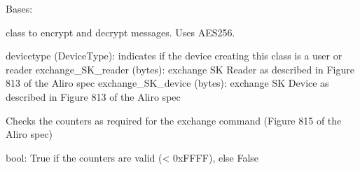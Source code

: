 \documentclass[letterpaper,10pt,english]{sphinxmanual}
\begin{document}
\begin{fulllineitems}
\label{\detokenize{aliro_actuator.access_protocol.encryption:aliro_actuator.access_protocol.encryption.EncryptionEngine}}
\pysigstartsignatures
{}
\pysigstopsignatures
\sphinxAtStartPar
Bases: 

\sphinxAtStartPar
class to encrypt and decrypt messages. Uses AES\sphinxhyphen{}256.
\begin{description}
\sphinxAtStartPar
devicetype (DeviceType): indicates if the device creating this class is a
user or reader
exchange\_SK\_reader (bytes): exchange SK Reader as described in Figure 8\sphinxhyphen{}13
of the Aliro spec
exchange\_SK\_device (bytes): exchange SK Device as described in Figure 8\sphinxhyphen{}13
of the Aliro spec

\end{description}

\begin{fulllineitems}
\label{\detokenize{aliro_actuator.access_protocol.encryption:aliro_actuator.access_protocol.encryption.EncryptionEngine.check_counters_valid}}
\pysigstartsignatures
{}
\pysigstopsignatures
\sphinxAtStartPar
Checks the counters as required for the exchange command (Figure 8\sphinxhyphen{}15 of the Aliro spec)
\begin{description}
\sphinxAtStartPar
bool: True if the counters are valid (\textless{} 0xFFFF), else False

\end{description}


\end{fulllineitems}
\end{fulllineitems}
\end{document}
